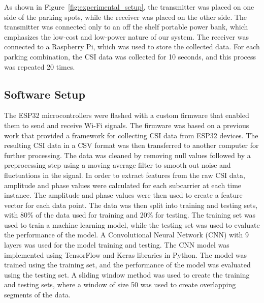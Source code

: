 As shown in Figure~\ref{fig:experimental_setup}, the transmitter was placed on one side of the parking spots, while the receiver was placed on the other side. The transmitter was connected only to an off the shelf portable power bank, which emphasizes the low-cost and low-power nature of our system. The receiver was connected to a Raspberry Pi, which was used to store the collected data. For each parking combination, the CSI data was collected for 10 seconds, and this process was repeated 20 times.

\subsection{Software Setup}

The ESP32 microcontrollers were flashed with a custom firmware that enabled them to send and receive Wi-Fi signals. The firmware was based on a previous work that provided a framework for collecting CSI data from ESP32 devices\cite{9217780}. The resulting CSI data in a CSV format was then transferred to another computer for further processing. The data was cleaned by removing null values followed by a preprocessing step using a moving average filter to smooth out noise and fluctuations in the signal. In order to extract features from the raw CSI data,  amplitude and phase values were calculated for each subcarrier at each time instance. The amplitude and phase values were then used to create a feature vector for each data point. The data was then split into training and testing sets, with 80\% of the data used for training and 20\% for testing. The training set was used to train a machine learning model, while the testing set was used to evaluate the performance of the model. A Convolutional Neural Network (CNN) with 9 layers was used for the model training and testing. The CNN model was implemented using TensorFlow and Keras libraries in Python. The model was trained using the training set, and the performance of the model was evaluated using the testing set. A sliding window method was used to create the training and testing sets, where a window of size 50 was used to create overlapping segments of the data.